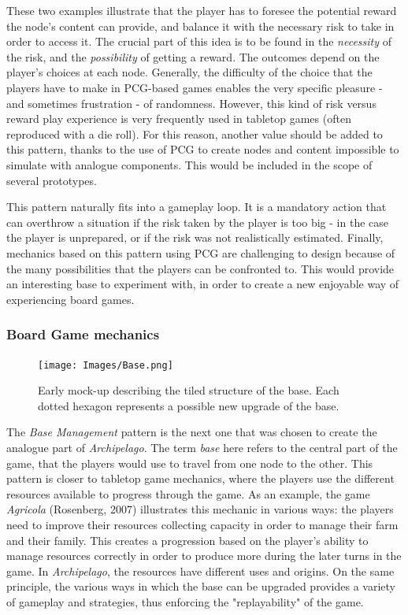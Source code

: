 These two examples illustrate that the player has to foresee the potential reward the node's content can provide, and balance it with the necessary risk to take in order to access it. The crucial part of this idea is to be found in the \textit{necessity} of the risk, and the \textit{possibility} of getting a reward. The outcomes depend on the player's choices at each node. Generally, the difficulty of the choice that the players have to make in PCG-based games enables the very specific pleasure - and sometimes frustration - of randomness. However, this kind of risk versus reward play experience is very frequently used in tabletop games (often reproduced with a die roll). For this reason, another value should be added to this pattern, thanks to the use of PCG to create nodes and content impossible to simulate with analogue components. This would be included in the scope of several prototypes.

This pattern naturally fits into a gameplay loop. It is a mandatory action that can overthrow a situation if the risk taken by the player is too big - in the case the player is unprepared, or if the risk was not realistically estimated. Finally, mechanics based on this pattern using PCG are challenging to design because of the many possibilities that the players can be confronted to. This would provide an interesting base to experiment with, in order to create a new enjoyable way of experiencing board games.
\subsubsection{Board Game mechanics}
\begin{figure}[!ht]
    \centering
    \texttt{[image: Images/Base.png]}
    \caption{Early mock-up describing the tiled structure of the base. Each dotted hexagon represents a possible new upgrade of the base.}
    \label{fig:base}
\end{figure}
The \textit{Base Management} pattern is the next one that was chosen to create the analogue part of \textit{Archipelago}. The term \textit{base} here refers to the central part of the game, that the players would use to travel from one node to the other. This pattern is closer to tabletop game mechanics, where the players use the different resources available to progress through the game. As an example, the game \textit{Agricola} (Rosenberg, 2007) \cite{game:agri} illustrates this mechanic in various ways: the players need to improve their resources collecting capacity in order to manage their farm and their family. This creates a progression based on the player's ability to manage resources correctly in order to produce more during the later turns in the game. In \textit{Archipelago}, the resources have different uses and origins. On the same principle, the various ways in which the base can be upgraded provides a variety of gameplay and strategies, thus enforcing the "replayability" of the game.

